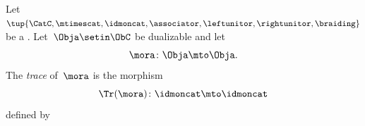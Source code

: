 
\begin{ctdefinition}
    \label{def:trace_endo}
    Let~$\tup{\CatC, \mtimescat, \idmoncat, \associator, \leftunitor, \rightunitor, \braiding}$ be a .
    Let~$\Obja \setin \ObC$ be dualizable and let
    \begin{equation}
        \mora \colon \Obja \mto \Obja.
    \end{equation}
    The \emph{trace} of~$\mora$ is the morphism
    \begin{equation}
        \Tr(\mora) \colon \idmoncat \mto \idmoncat
    \end{equation}
    defined by
\end{ctdefinition}

